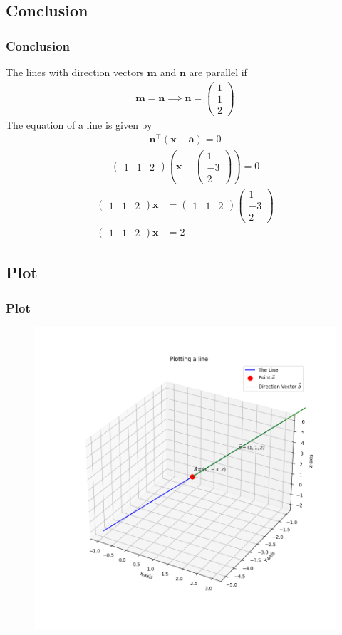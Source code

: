 \documentclass{beamer}
\providecommand{\brak}[1]{\ensuremath{\left(#1\right)}}
\theoremstyle{remark}
\newcommand{\myvec}[1]{\ensuremath{\begin{pmatrix}#1\end{pmatrix}}}
\let\vec\mathbf
\numberwithin{equation}{section}
\begin{document}
\subsection{Conclusion}
\begin{frame}
\frametitle{Conclusion}
 The lines with direction vectors $\vec{m}$ and $\vec{n}$ are parallel if
\begin{align}
\vec{m}=\vec{n}  \implies  \vec{n}=\myvec{1\\1\\2}
\end{align}
The equation of a line is given by
\begin{align}
\vec{n}^\top\brak{\vec{x}-\vec{a}}=0  
\end{align}
\begin{align}
\myvec{1&1&2}\brak{\vec{x}-\myvec{1\\-3\\2}}=0 
\end{align}
\begin{align}
\myvec{1&1&2}\vec{x}&=\myvec{1&1&2}\myvec{1\\-3\\2} \\
\myvec{1&1&2}\vec{x}&=2
\end{align}
\end{frame}

\subsection{Plot}
\begin{frame}[fragile]
\frametitle{Plot}

\begin{figure}[h!]
   \centering
   \includegraphics[width=0.7\columnwidth]{figs/fig1.png}
	\caption{}
   \label{}
\end{figure}
\end{frame}
\end{document}
